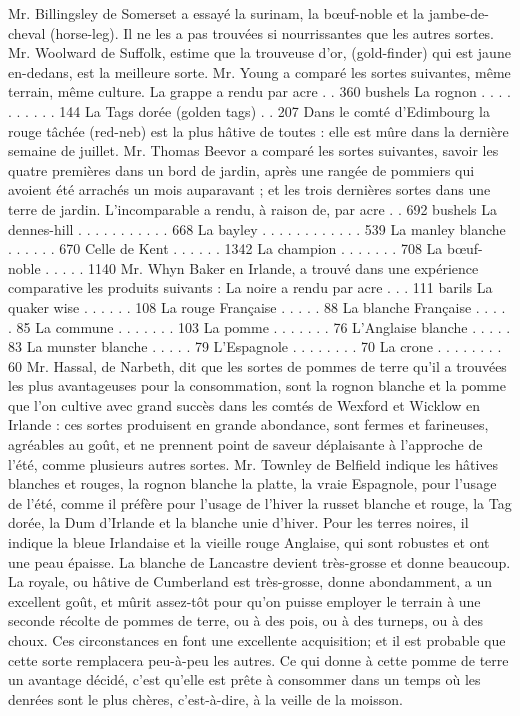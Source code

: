 Mr. Billingsley de Somerset a essayé la surinam, la bœuf-noble et la jambe-de-cheval (horse-leg). Il ne les a pas trouvées si nourrissantes que les autres sortes.
Mr. Woolward de Suffolk, estime que la trouveuse d'or, (gold-finder) qui est jaune en-dedans, est la meilleure sorte.
Mr. Young a comparé les sortes suivantes, même terrain, même culture.
La grappe a rendu par acre . . 360 bushels
La rognon . . . . . . . . . . 144
La Tags dorée (golden tags) . . 207
Dans le comté d'Edimbourg la rouge tâchée (red-neb) est la plus hâtive de toutes : elle est mûre dans la dernière semaine de juillet.
Mr. Thomas Beevor a comparé les sortes suivantes, savoir les quatre premières dans un bord de jardin, après une rangée de pommiers qui avoient été arrachés un mois auparavant ; et les trois dernières sortes dans une terre de jardin.
L'incomparable a rendu, à raison de, par acre . . 692 bushels
La dennes-hill . . . . . . . . . . . 668
La bayley . . . . . . . . . . . . 539
La manley blanche . . . . . . 670\setcounter{page}{264} Celle de Kent . . . . . . 1342
La champion . . . . . . . 708
La bœuf-noble . . . . . 1140
Mr. Whyn Baker en Irlande, a trouvé dans une expérience comparative les produits suivants :
La noire a rendu par acre . . . 111 barils
La quaker wise . . . . . . 108
La rouge Française . . . . . 88
La blanche Française . . . . . 85
La commune . . . . . . . 103
La pomme . . . . . . . 76
L'Anglaise blanche . . . . . 83
La munster blanche . . . . . 79
L'Espagnole . . . . . . . . 70
La crone . . . . . . . . 60
Mr. Hassal, de Narbeth, dit que les sortes de pommes de terre qu'il a trouvées les plus avantageuses pour la consommation, sont la rognon blanche et la pomme que l'on cultive avec grand succès dans les comtés de Wexford et Wicklow en Irlande : ces sortes produisent en grande abondance, sont fermes et farineuses, agréables au goût, et ne prennent point de saveur déplaisante à l'approche de l'été, comme plusieurs autres sortes.
Mr. Townley de Belfield indique les hâtives blanches et rouges, la rognon blanche\setcounter{page}{265} la platte, la vraie Espagnole, pour l'usage de l'été, comme il préfère pour l'usage de l'hiver la russet blanche et rouge, la Tag dorée, la Dum d'Irlande et la blanche unie d'hiver. Pour les terres noires, il indique la bleue Irlandaise et la vieille rouge Anglaise, qui sont robustes et ont une peau épaisse. La blanche de Lancastre devient très-grosse et donne beaucoup.
La royale, ou hâtive de Cumberland est très-grosse, donne abondamment, a un excellent goût, et mûrit assez-tôt pour qu'on puisse employer le terrain à une seconde récolte de pommes de terre, ou à des pois, ou à des turneps, ou à des choux. Ces circonstances en font une excellente acquisition; et il est probable que cette sorte remplacera peu-à-peu les autres. Ce qui donne à cette pomme de terre un avantage décidé, c'est qu'elle est prête à consommer dans un temps où les denrées sont le plus chères, c'est-à-dire, à la veille de la moisson.
